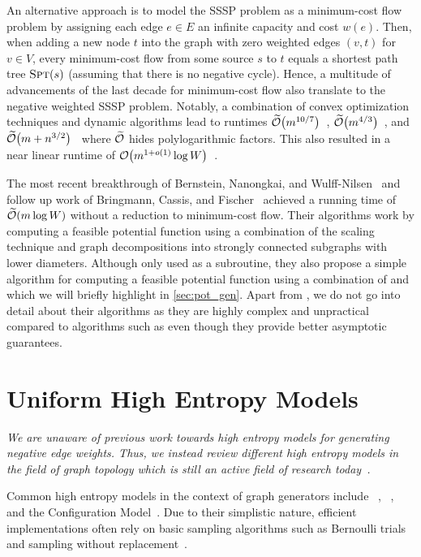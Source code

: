 An alternative approach is to model the SSSP problem as a minimum-cost flow problem by assigning each edge $e \in E$ an infinite capacity and cost $w(e)$.
Then, when adding a new node $t$ into the graph with zero weighted edges $(v, t)$ for $v \in V$, every minimum-cost flow from some source $s$ to $t$ equals a shortest path tree $\textsc{Spt}(s)$ (assuming that there is no negative cycle).
Hence, a multitude of advancements of the last decade for minimum-cost flow also translate to the negative weighted SSSP problem.
Notably, a combination of convex optimization techniques and dynamic algorithms lead to runtimes $\widetilde{\mathcal O}\!\left(m^{10 / 7}\right)$~\cite{MinFlow1}, $\widetilde{\mathcal O}\!\left(m^{4 / 3}\right)$~\cite{MinFlow2}, and $\widetilde{\mathcal O}\!\left(m + n^{3 / 2}\right)$~\cite{MinFlow3, MinFlow4} where $\widetilde{\mathcal O}$ hides polylogarithmic factors.
This also resulted in a near linear runtime of $\mathcal O\!\left(m^{1 + o(1)}\log W\right)$~\cite{MinFlowNearLinear}.

The most recent breakthrough of Bernstein, Nanongkai, and Wulff-Nilsen~\cite{NegSSSPNearLinear} and follow up work of Bringmann, Cassis, and Fischer~\cite{NegSSSPNowFaster} achieved a running time of $\widetilde{\mathcal O}\!\left(m\log W\right)$ without a reduction to minimum-cost flow.
Their algorithms work by computing a feasible potential function using a combination of the scaling technique and graph decompositions into strongly connected subgraphs with lower diameters.
Although only used as a subroutine, they also propose a simple algorithm \algen for computing a feasible potential function using a combination of \algdk and \algbf which we will briefly highlight in \cref{sec:pot_gen}.
Apart from \algen, we do not go into detail about their algorithms as they are highly complex and unpractical compared to algorithms such as \algbf even though they provide better asymptotic guarantees.


\section{Uniform High Entropy Models}
\emph{
  \noindent We are unaware of previous work towards high entropy models for generating negative edge weights.
  Thus, we instead review different high entropy models in the field of graph topology which is still an active field of research today~\cite{DBLP:books/crc/22/PenschuckBHL0S0022}. 
}

\bigskip

Common high entropy models in the context of graph generators include \Gnp~\cite{gilbert1959random}, \Gnm~\cite{erdds1959random}, and the Configuration Model~\cite{DBLP:journals/jct/BenderC78,newmann10,bollobas1985random,DBLP:journals/rsa/MolloyR95a}.
Due to their simplistic nature, efficient implementations often rely on basic sampling algorithms such as Bernoulli trials and sampling without replacement~\cite{batagelj2005efficient,DBLP:conf/edbt/NobariLKB11,DBLP:journals/toms/SandersLHSD18,DBLP:journals/jpdc/FunkeLMPSSSL19}.

